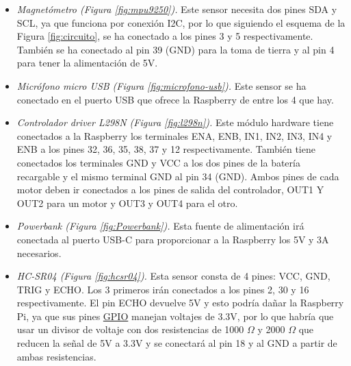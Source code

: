 \begin{itemize}
 \item \textit{Magnetómetro (Figura \ref{fig:mpu9250}).} Este sensor necesita dos pines SDA y SCL, ya que funciona por conexión I2C, por lo que siguiendo el esquema de la Figura \ref{fig:circuito}, se ha conectado a los pines 3 y 5 respectivamente. También se ha conectado al pin 39 (GND) para la toma de tierra y al pin 4 para tener la alimentación de  5V. 
 \item \textit{Micrófono micro USB (Figura \ref{fig:microfono-usb}).} Este sensor se ha conectado en el puerto USB que ofrece la Raspberry de entre los 4 que hay.
 \item \textit{Controlador driver L298N (Figura \ref{fig:l298n}).} Este módulo hardware tiene conectados a la Raspberry los terminales ENA, ENB, IN1, IN2, IN3, IN4 y ENB a los pines 32, 36, 35, 38, 37 y 12 respectivamente. También tiene conectados los terminales GND y VCC a los dos pines de la batería recargable y el mismo terminal GND al pin 34 (GND). Ambos pines de cada motor deben ir conectados a los pines de salida del controlador, OUT1 Y OUT2 para un motor y OUT3 y OUT4 para el otro.
 \item \textit{Powerbank (Figura \ref{fig:Powerbank}).} Esta fuente de alimentación irá conectada al puerto USB-C para proporcionar a la Raspberry los 5V y 3A necesarios.
  \item \textit{HC-SR04 (Figura \ref{fig:hcsr04}).} Esta sensor consta de 4 pines: VCC, GND, TRIG y ECHO. Los 3 primeros irán conectados a los pines 2, 30 y 16 respectivamente. El pin ECHO devuelve 5V y esto podría dañar la Raspberry Pi, ya que sus pines \hyperlink{GPIO}{GPIO} manejan voltajes de 3.3V, por lo que habría que usar un divisor de voltaje con dos resistencias de 1000 $\Omega$ y 2000 $\Omega$ que reducen la señal de 5V a 3.3V y se conectará al pin 18 y al GND a partir de ambas resistencias.
\end{itemize}\


